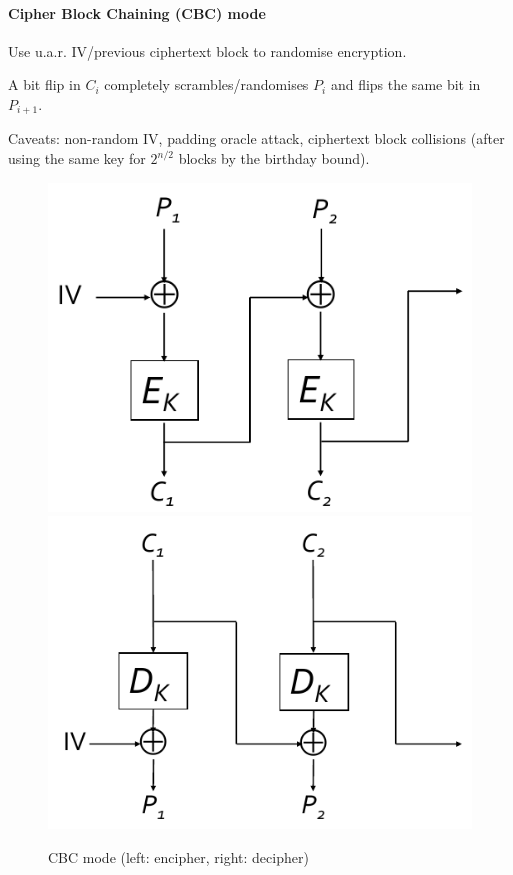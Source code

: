 \paragraph{Cipher Block Chaining (CBC) mode}
Use u.a.r. IV/previous ciphertext block to randomise encryption.

A bit flip in $C_i$ completely scrambles/randomises $P_i$ and flips the same bit in $P_{i+1}$.

Caveats: non-random IV, padding oracle attack, ciphertext block collisions (after using the same key for $2^{n/2}$ blocks by the birthday bound).

\begin{figure}[h]
    \centering
	\includegraphics[scale=0.4]{images/cbc-enc.png}
	\includegraphics[scale=0.4]{images/cbc-dec.png}
    \caption{CBC mode (left: encipher, right: decipher)}
    \label{fig:cbc}
\end{figure}

